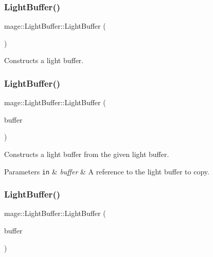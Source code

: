 \subsubsection{\texorpdfstring{Light\+Buffer()}{LightBuffer()}\hspace{0.1cm}{\footnotesize\ttfamily [1/3]}}
{\footnotesize\ttfamily mage\+::\+Light\+Buffer\+::\+Light\+Buffer (\begin{DoxyParamCaption}{ }\end{DoxyParamCaption})}

Constructs a light buffer. \hypertarget{structmage_1_1_light_buffer_a94aed51e6bdaf47c5f818f84b3e4edf4}{}\label{structmage_1_1_light_buffer_a94aed51e6bdaf47c5f818f84b3e4edf4} 
\subsubsection{\texorpdfstring{Light\+Buffer()}{LightBuffer()}\hspace{0.1cm}{\footnotesize\ttfamily [2/3]}}
{\footnotesize\ttfamily mage\+::\+Light\+Buffer\+::\+Light\+Buffer (\begin{DoxyParamCaption}\item[{const \hyperlink{structmage_1_1_light_buffer}{Light\+Buffer} \&}]{buffer }\end{DoxyParamCaption})\hspace{0.3cm}{\ttfamily [default]}}

Constructs a light buffer from the given light buffer.


\begin{DoxyParams}[1]{Parameters}
\mbox{\tt in}  & {\em buffer} & A reference to the light buffer to copy. \\
\hline
\end{DoxyParams}
\hypertarget{structmage_1_1_light_buffer_af0bb4f34aebc13b8cbd81e26fb8f6ecf}{}\label{structmage_1_1_light_buffer_af0bb4f34aebc13b8cbd81e26fb8f6ecf} 
\subsubsection{\texorpdfstring{Light\+Buffer()}{LightBuffer()}\hspace{0.1cm}{\footnotesize\ttfamily [3/3]}}
{\footnotesize\ttfamily mage\+::\+Light\+Buffer\+::\+Light\+Buffer (\begin{DoxyParamCaption}\item[{\hyperlink{structmage_1_1_light_buffer}{Light\+Buffer} \&\&}]{buffer }\end{DoxyParamCaption})\hspace{0.3cm}{\ttfamily [default]}}

